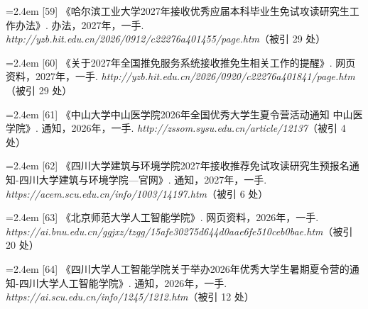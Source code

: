 {\noindent\hangindent=2.4em \label{src:S0066}{\color{cAccent}[59]} 《哈尔滨工业大学2027年接收优秀应届本科毕业生免试攻读研究生工作办法》. 办法，2027年，一手. \textit{http://yzb.hit.edu.cn/2026/0912/c22276a401455/page.htm}（被引 29 处）\par
\vspace{0.6pt}
\noindent\hangindent=2.4em \label{src:S0067}{\color{cAccent}[60]} 《关于2027年全国推免服务系统接收推免生相关工作的提醒》. 网页资料，2027年，一手. \textit{http://yzb.hit.edu.cn/2026/0920/c22276a401841/page.htm}（被引 29 处）\par
\vspace{0.6pt}
\vspace{3.5pt}\par
\nopagebreak\vspace{1pt}
\noindent\hangindent=2.4em \label{src:S0069}{\color{cAccent}[61]} 《中山大学中山医学院2026年全国优秀大学生夏令营活动通知 \textbar{} 中山医学院》. 通知，2026年，一手. \textit{http://zssom.sysu.edu.cn/article/12137}（被引 4 处）\par
\vspace{0.6pt}
\vspace{3.5pt}\par
\nopagebreak\vspace{1pt}
\noindent\hangindent=2.4em \label{src:S0070}{\color{cAccent}[62]} 《四川大学建筑与环境学院2027年接收推荐免试攻读研究生预报名通知-四川大学建筑与环境学院—官网》. 通知，2027年，一手. \textit{https://acem.scu.edu.cn/info/1003/14197.htm}（被引 6 处）\par
\vspace{0.6pt}
\vspace{3.5pt}\par
\nopagebreak\vspace{1pt}
\noindent\hangindent=2.4em \label{src:S0072}{\color{cAccent}[63]} 《北京师范大学人工智能学院》. 网页资料，2026年，一手. \textit{https://ai.bnu.edu.cn/ggjxz/tzgg/15afe30275d644d0aae6fe510ceb0bae.htm}（被引 20 处）\par
\vspace{0.6pt}
\vspace{3.5pt}\par
\nopagebreak\vspace{1pt}
\noindent\hangindent=2.4em \label{src:S0073}{\color{cAccent}[64]} 《四川大学人工智能学院关于举办2026年优秀大学生暑期夏令营的通知-四川大学人工智能学院》. 通知，2026年，一手. \textit{https://ai.scu.edu.cn/info/1245/1212.htm}（被引 12 处）\par
}
